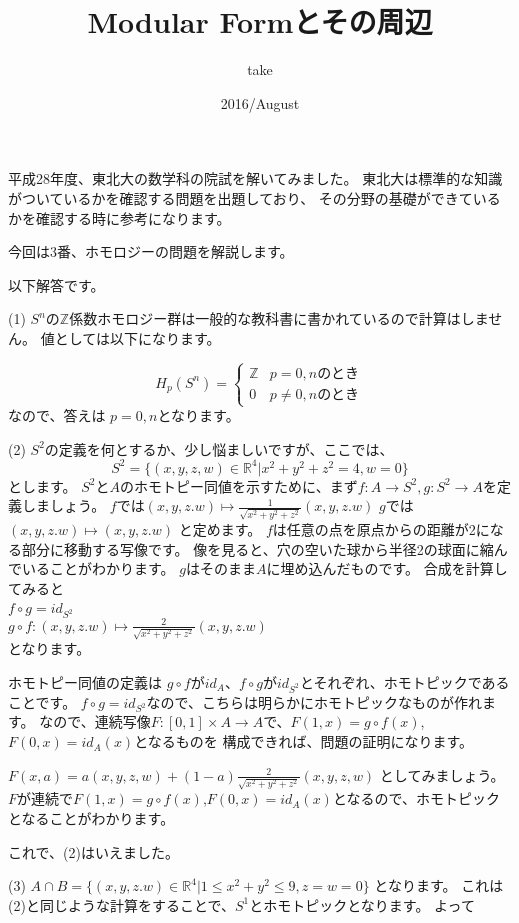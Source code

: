 \documentclass{ujarticle}
\title{Modular Formとその周辺}
\author{take}
\date{2016/August}
\begin{document}
平成28年度、東北大の数学科の院試を解いてみました。
東北大は標準的な知識がついているかを確認する問題を出題しており、
その分野の基礎ができているかを確認する時に参考になります。

今回は3番、ホモロジーの問題を解説します。

以下解答です。

(1)
$S^n$の$\mathbb{Z}$係数ホモロジー群は一般的な教科書に書かれているので計算はしません。
値としては以下になります。

\begin{equation*}
  H_p(S^n ) =
  \begin{cases}
    \mathbb{Z} & \text{$p =0,n$のとき}　\\
    0  & \text{$p  \neq 0,n$のとき}
  \end{cases}
\end{equation*}
なので、答えは
$p =0,n$となります。

(2)
$S^2$の定義を何とするか、少し悩ましいですが、ここでは、
\begin{equation*}
  S^2 = \{ (x,y,z,w) \in \mathbb{R}^4 |  x^2 + y^2 + z^2 = 4 ,w =0 \}
\end{equation*}
とします。
$S^2$と$A$のホモトピー同値を示すために、まず$f:A \to S^2,g:S^2 \to A$を定義しましょう。
$f$では$(x,y,z.w) \mapsto  \frac{1}{\sqrt{x^2 + y^2 + z^2}}(x,y,z.w)$
$g$では$(x,y,z.w) \mapsto  (x,y,z.w)$
と定めます。
$f$は任意の点を原点からの距離が2になる部分に移動する写像です。
像を見ると、穴の空いた球から半径2の球面に縮んでいることがわかります。
$g$はそのまま$A$に埋め込んだものです。
合成を計算してみると　\\
$f \circ g = id_{S^2}$　 \\
$g \circ f :(x,y,z.w) \mapsto \frac{2}{\sqrt{x^2 + y^2 + z^2}}(x,y,z.w) $ \\
となります。

ホモトピー同値の定義は
$g \circ f$が$id_A$、$f \circ  g$が$id_{S^2}$とそれぞれ、ホモトピックであることです。
$f \circ g = id_{S^2}$なので、こちらは明らかにホモトピックなものが作れます。
なので、連続写像$F:[0,1] \times A \to A$で、$F(1,x)=g \circ f (x)$,$F(0,x) = id_A(x)$となるものを
構成できれば、問題の証明になります。

$F(x ,a) =a(x,y,z,w)+(1-a)\frac{2}{\sqrt{x^2 + y^2 + z^2}}(x,y,z,w)$
としてみましょう。
$F$が連続で$F(1,x)=g \circ f (x)$,$F(0,x) = id_A(x)$となるので、ホモトピックとなることがわかります。

これで、(2)はいえました。

(3)
$A \cap B = \{ (x,y,z.w) \in \mathbb{R}^4 |  1 \le x^2 + y^2  \le 9 ,z=w =0 \}$
となります。
これは(2)と同じような計算をすることで、$S^1$とホモトピックとなります。
よって
\end{document}

